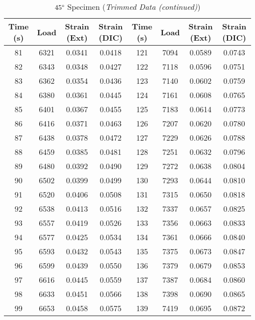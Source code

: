 \begin{table}[!h]
    \centering
    \caption{$45\degree$ Specimen (\textit{Trimmed Data (continued)})}
    \begin{tabular}{|c||c|c|c||c||c|c|c|}\toprule
        \textbf{Time (s)} & \textbf{Load} & \textbf{Strain (Ext)} & \textbf{Strain (DIC)} & \textbf{Time (s)} & \textbf{Load} & \textbf{Strain (Ext)} & \textbf{Strain (DIC)}\\\midrule
        81 & 6321 & 0.0341 & 0.0418  & 121 & 7094 & 0.0589 & 0.0743 \\\hline
        82 & 6343 & 0.0348 & 0.0427  & 122 & 7118 & 0.0596 & 0.0751 \\\hline
        83 & 6362 & 0.0354 & 0.0436  & 123 & 7140 & 0.0602 & 0.0759 \\\hline
        84 & 6380 & 0.0361 & 0.0445  & 124 & 7161 & 0.0608 & 0.0765 \\\hline
        85 & 6401 & 0.0367 & 0.0455  & 125 & 7183 & 0.0614 & 0.0773 \\\hline
        86 & 6416 & 0.0371 & 0.0463  & 126 & 7207 & 0.0620 & 0.0780 \\\hline
        87 & 6438 & 0.0378 & 0.0472  & 127 & 7229 & 0.0626 & 0.0788 \\\hline
        88 & 6459 & 0.0385 & 0.0481  & 128 & 7251 & 0.0632 & 0.0796 \\\hline
        89 & 6480 & 0.0392 & 0.0490  & 129 & 7272 & 0.0638 & 0.0804 \\\hline
        90 & 6502 & 0.0399 & 0.0499  & 130 & 7293 & 0.0644 & 0.0810 \\\hline
        91 & 6520 & 0.0406 & 0.0508  & 131 & 7315 & 0.0650 & 0.0818 \\\hline
        92 & 6538 & 0.0413 & 0.0516  & 132 & 7337 & 0.0657 & 0.0825 \\\hline
        93 & 6557 & 0.0419 & 0.0526  & 133 & 7356 & 0.0663 & 0.0833 \\\hline
        94 & 6577 & 0.0425 & 0.0534  & 134 & 7361 & 0.0666 & 0.0840 \\\hline
        95 & 6593 & 0.0432 & 0.0543  & 135 & 7375 & 0.0673 & 0.0847 \\\hline
        96 & 6599 & 0.0439 & 0.0550  & 136 & 7379 & 0.0679 & 0.0853 \\\hline
        97 & 6616 & 0.0445 & 0.0559  & 137 & 7387 & 0.0684 & 0.0860 \\\hline
        98 & 6633 & 0.0451 & 0.0566  & 138 & 7398 & 0.0690 & 0.0865 \\\hline
        99 & 6653 & 0.0458 & 0.0575  & 139 & 7419 & 0.0695 & 0.0872 \\\hline

\end{tabular}
\end{table}
